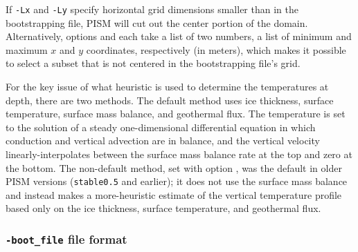 If \texttt{-Lx} and \texttt{-Ly} specify horizontal grid dimensions smaller than in the bootstrapping file, PISM will cut out the center portion of the domain.  Alternatively, options  and  each take a list of two numbers, a list of minimum and maximum $x$ and $y$ coordinates, respectively (in meters), which makes it possible to select a subset that is not centered in the bootstrapping file's grid.

For the key issue of what heuristic is used to determine the temperatures at depth, there are two methods.  The default method uses ice thickness, surface temperature, surface mass balance, and geothermal flux.  The temperature is set to the solution of a steady one-dimensional differential equation in which conduction and vertical advection are in balance, and the vertical velocity linearly-interpolates between the surface mass balance rate at the top and zero at the bottom.  The non-default method, set with option , was the default in older PISM versions (\texttt{stable0.5} and earlier); it does not use the surface mass balance and instead makes a more-heuristic estimate of the vertical temperature profile based only on the ice thickness, surface temperature, and geothermal flux.

\subsubsection*{\texttt{-boot_file} file format}
\label{sec:bootstrapping-format}


